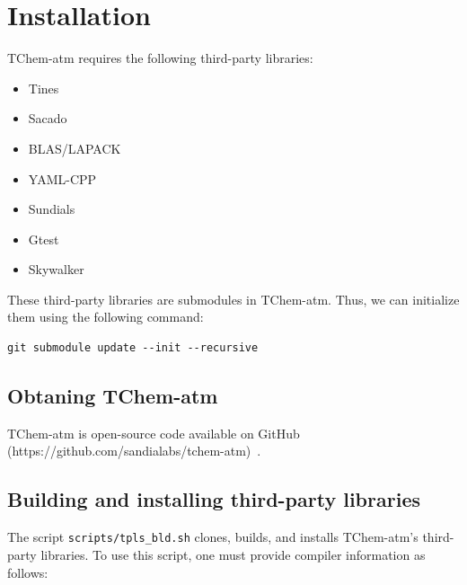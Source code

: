 \documentclass[report, 12pt]{SANDreport}
\begin{document}


\chapter{Installation}
\label{ch:install}
TChem-atm requires the following third-party libraries:
\begin{itemize}
  \item Tines~\cite{tinesweb}
  \item Sacado~\cite{sacadoweb} 
  \item BLAS/LAPACK~\cite{openBLASweb, Wang:openBLAS:2013,Xianyi:openBLAS:2012}
  \item YAML-CPP~\cite{yaml}
  \item Sundials~\cite{SUNDIALS_gardner2022, SUNDIALS_hindmarsh2005}
  \item Gtest~\cite{gtestweb}
  \item Skywalker\cite{skywalkerweb}
\end{itemize}

These third-party libraries are submodules in TChem-atm. Thus, we can initialize them using the following command:

\begin{verbatim}
git submodule update --init --recursive
\end{verbatim}

\section{Obtaning TChem-atm}

TChem-atm is open-source code available on GitHub (https://github.com/sandialabs/tchem-atm)~\cite{tchem-atm}.

\section{Building and installing third-party libraries}

The script \verb|scripts/tpls_bld.sh| clones, builds, and installs TChem-atm's third-party libraries. To use this script, one must provide compiler information as follows:
\end{document}
